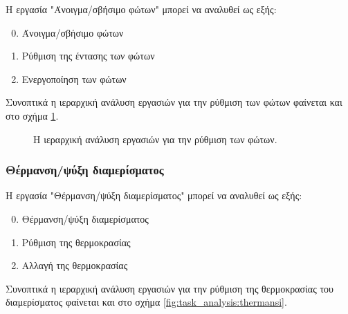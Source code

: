 \documentclass{assignment}
\begin{document}
Η εργασία "Άνοιγμα/σβήσιμο φώτων" μπορεί να αναλυθεί ως εξής:

\begin{enumerate}
\setcounter{enumi}{-1}
\item Άνοιγμα/σβήσιμο φώτων
\item Ρύθμιση της έντασης των φώτων
\item Ενεργοποίηση των φώτων
\end{enumerate}

Συνοπτικά η ιεραρχική ανάλυση εργασιών για την ρύθμιση των φώτων φαίνεται και στο σχήμα \ref{fig:task_analysis:fota}.

\begin{figure}
\begin{center}
\caption{Η ιεραρχική ανάλυση εργασιών για την ρύθμιση των φώτων.}
\label{fig:task_analysis:fota}
\end{center}
\end{figure}


\subsubsection{Θέρμανση/ψύξη διαμερίσματος}

Η εργασία "Θέρμανση/ψύξη διαμερίσματος" μπορεί να αναλυθεί ως εξής:

\begin{enumerate}
\setcounter{enumi}{-1}
\item Θέρμανση/ψύξη διαμερίσματος
\item Ρύθμιση της θερμοκρασίας
\item Αλλαγή της θερμοκρασίας
\end{enumerate}

Συνοπτικά η ιεραρχική ανάλυση εργασιών για την ρύθμιση της θερμοκρασίας του διαμερίσματος φαίνεται και στο σχήμα \ref{fig:task_analysis:thermansi}.
\end{document}
